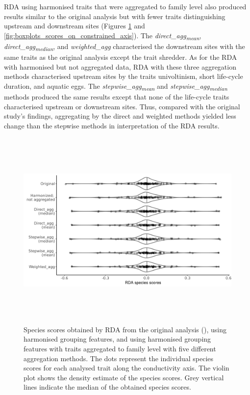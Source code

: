 \documentclass{article}
\begin{document}
RDA using harmonised traits that were aggregated to family level also produced results similar to the original analysis but with fewer traits distinguishing upstream and downstream sites (Figures \ref{fig:violin_plot_species_sc} and \ref{fig:boxplots_scores_on_constrained_axis}). The \textit{direct\_agg\textsubscript{mean}}, \textit{direct\_agg\textsubscript{median}}, and \textit{weighted\_agg} characterised the downstream sites with the same traits as the original analysis except the trait shredder. As for the RDA with harmonised but not aggregated data, RDA with these three aggregation methods characterised upstream sites by the traits univoltinism, short life-cycle duration, and aquatic eggs. The \textit{stepwise\_agg\textsubscript{mean}} and \textit{stepwise\_agg\textsubscript{median}} methods produced the same results except that none of the life-cycle traits characterised upstream or downstream sites. Thus, compared with the original study’s findings, aggregating by the direct and weighted methods yielded less change than the stepwise methods in interpretation of the RDA results.

\begin{figure}[H]
    \centering
    \includegraphics[width=16.5cm, height=10cm]{Species_scores_rda.png}
    \caption{Species scores obtained by RDA from the original analysis (\cite{szocs_effects_2014}), using harmonised grouping features, and using harmonised grouping features with traits aggregated to family level with five different aggregation methods. The dots represent the individual species scores for each analysed trait along the conductivity axis. The violin plot shows the density estimate of the species scores. Grey vertical lines indicate the median of the obtained species scores.}
    \label{fig:violin_plot_species_sc}
\end{figure}
\end{document}
